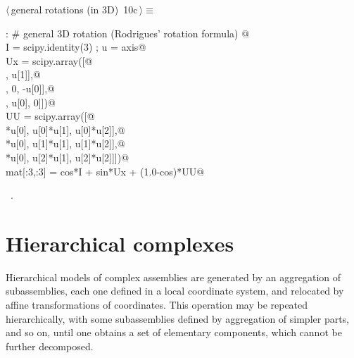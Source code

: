 \documentclass[11pt,oneside]{article}	%
\begin{document}
\begin{flushleft} \small \label{scrap25}
\protect{}$\langle\,$general rotations (in 3D)\nobreak\ {\footnotesize 10c}$\,\rangle\equiv$
\vspace{-1ex}
\begin{list}{}{} \item
\mbox{}\verb@else:    # general 3D rotation (Rodrigues' rotation formula)   @\\
\mbox{}\verb@   I = scipy.identity(3) ; u = axis@\\
\mbox{}\verb@   Ux = scipy.array([@\\
\mbox{}\verb@      [0,      -u[2],    u[1]],@\\
\mbox{}\verb@      [u[2],      0,    -u[0]],@\\
\mbox{}\verb@      [-u[1],   u[0],      0]])@\\
\mbox{}\verb@   UU = scipy.array([@\\
\mbox{}\verb@      [u[0]*u[0], u[0]*u[1],  u[0]*u[2]],@\\
\mbox{}\verb@      [u[1]*u[0], u[1]*u[1],  u[1]*u[2]],@\\
\mbox{}\verb@      [u[2]*u[0], u[2]*u[1],  u[2]*u[2]]])@\\
\mbox{}\verb@   mat[:3,:3] = cos*I + sin*Ux + (1.0-cos)*UU@\\
\mbox{}\verb@@{\NWsep}
\end{list}
\vspace{-1ex}
\footnotesize\addtolength{\baselineskip}{-1ex}
\begin{list}{}{\setlength{\itemsep}{-\parsep}\setlength{\itemindent}{-\leftmargin}}
\item \NWtxtMacroRefIn\ .
\end{list}
\end{flushleft}
\section{Hierarchical complexes}
Hierarchical models of complex assemblies are generated by an aggregation
of subassemblies, each one defined in a local coordinate system, and
relocated by affine transformations of coordinates.  This operation
may be repeated hierarchically, with some subassemblies defined by
aggregation of simpler parts, and so on, until one obtains a set of
elementary components, which cannot be further decomposed.
\end{document}
